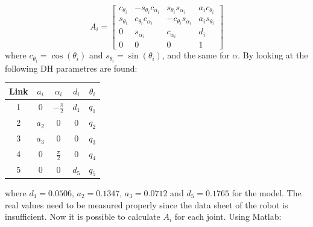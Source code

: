 $$
A_i = 
    \begin{bmatrix}
        c_{\theta_i} & -s_{\theta_i}c_{\alpha_i} & s_{\theta_i}s_{\alpha_i} & a_ic_{\theta_i}\\
        s_{\theta_i} & c_{\theta_i}c_{\alpha_i} & -c_{\theta_i}s_{\alpha_i} & a_is_{\theta_i}\\
        0 & s_{\alpha_i} & c_{\alpha_i} &d_i\\
        0 & 0 & 0 & 1
    \end{bmatrix}
$$
where $c_{\theta_i} = \cos{(\theta_i)}$ and $s_{\theta_i} = \sin{(\theta_i)}$, and the same for $\alpha$. 
By looking at  the following DH parametres are found:
\begin{center}
    \begin{tabular}{|c|c|c|c|c|}
         \hline
         Link & $a_i$ & $\alpha_i$ & $d_i$ & $\theta_i$ \\ \hline
         1 & 0 & $-\frac{\pi}{2}$ & $d_1$ & $q_1$ \\
         2 & $a_2$ & 0 & 0 & $q_2$ \\ 
         3 & $a_3$ & 0 & 0 & $q_3$\\
         4 & 0 & $\frac{\pi}{2}$ & 0 & $q_4$\\
         5 & 0 & 0 & $d_5$ & $q_5$\\
         \hline
    \end{tabular}
\end{center}


where $d_1 = 0.0506$, $a_2 = 0.1347$, $a_3 = 0.0712$ and $d_5 = 0.1765$ for the model. The real values need to be measured properly since the data sheet of the robot is insufficient. 
Now it is possible to calculate $A_i$ for each joint. Using Matlab:

